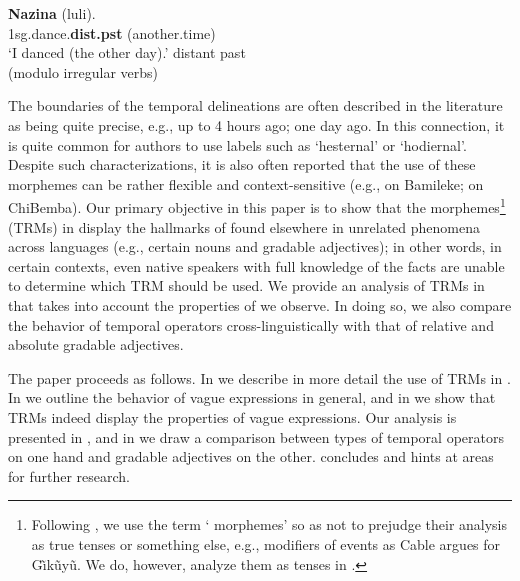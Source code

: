 \documentclass[output=paper,
modfonts
]{langscibook}
\begin{document}
\ea
\label{tense3}
\gll \textbf{Nazina} (luli). \\
{\sc1sg}.dance{\sc.\textbf{dist.pst}} (another.time) \\
\glt `I danced (the other day).'  \hfill {\sc distant past} \\
 \hfill (modulo irregular verbs)
\z




The boundaries of the temporal delineations are often described in the literature as being quite precise, e.g., up to 4 hours ago; one day ago. In this connection, it is quite common for authors to use labels such as `hesternal' or `hodiernal'. Despite such characterizations, it is also often reported that the use of these morphemes can be rather flexible and context-sensitive  (e.g., \citealt{hyman80relative} on Bamileke; \citealt{sharman56tabulation} on ChiBemba). Our primary objective in this paper is to show that the  morphemes\footnote{Following \citet{cable12beyond}, we use the term ` morphemes' so as not to prejudge their analysis as true tenses or something else, e.g., modifiers of events as Cable argues for G\~\i k\~uy\~u. We do, however, analyze them as tenses in .} (TRMs) in  display the hallmarks of  found elsewhere in unrelated phenomena across languages (e.g., certain nouns and gradable adjectives); in other words, in certain contexts, even native speakers with full knowledge of the facts are unable to determine which TRM should be used.  We provide an analysis of TRMs in  that takes into account the properties of  we observe. In doing so, we also compare the behavior of temporal operators cross-linguistically with that of relative and absolute gradable adjectives.


The paper proceeds as follows. In  we describe in more detail the use of TRMs in . In  we outline the behavior of vague expressions in general, and in  we show that  TRMs indeed display the properties of vague expressions. Our analysis is presented in , and in  we draw a comparison between types of temporal operators on one hand and gradable adjectives on the other.  concludes and hints at areas for further research.
\end{document}
